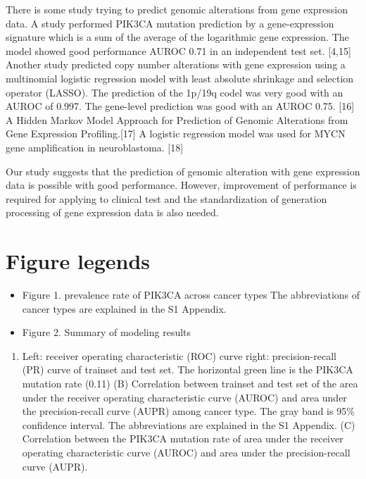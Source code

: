 \documentclass[10pt,letterpaper]{article}
\providecommand{\tightlist}{%
  \setlength{\itemsep}{0pt}\setlength{\parskip}{0pt}}
\begin{document}
There is some study trying to predict genomic alterations from gene
expression data. A study performed PIK3CA mutation prediction by a
gene-expression signature which is a sum of the average of the
logarithmic gene expression. The model showed good performance AUROC
0.71 in an independent test set. {[}4,15{]} Another study predicted copy
number alterations with gene expression using a multinomial logistic
regression model with least absolute shrinkage and selection operator
(LASSO). The prediction of the 1p/19q codel was very good with an AUROC
of 0.997. The gene-level prediction was good with an AUROC 0.75.
{[}16{]} A Hidden Markov Model Approach for Prediction of Genomic
Alterations from Gene Expression Profiling.{[}17{]} A logistic
regression model was used for MYCN gene amplification in neuroblastoma.
{[}18{]}

Our study suggests that the prediction of genomic alteration with gene
expression data is possible with good performance. However, improvement
of performance is required for applying to clinical test and the
standardization of generation processing of gene expression data is also
needed.

\hypertarget{figure-legends}{%
\section{Figure legends}\label{figure-legends}}

\begin{itemize}
\item
  Figure 1. prevalence rate of PIK3CA across cancer types The
  abbreviations of cancer types are explained in the S1 Appendix.
\item
  Figure 2. Summary of modeling results
\end{itemize}

\begin{enumerate}
\def\labelenumi{(\Alph{enumi})}
\tightlist
\item
  Left: receiver operating characteristic (ROC) curve right:
  precision-recall (PR) curve of trainset and test set. The horizontal
  green line is the PIK3CA mutation rate (0.11) (B) Correlation between
  trainset and test set of the area under the receiver operating
  characteristic curve (AUROC) and area under the precision-recall curve
  (AUPR) among cancer type. The gray band is 95\% confidence interval.
  The abbreviations are explained in the S1 Appendix. (C) Correlation
  between the PIK3CA mutation rate of area under the receiver operating
  characteristic curve (AUROC) and area under the precision-recall curve
  (AUPR).
\end{enumerate}
\end{document}
